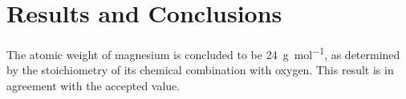 \documentclass[
	letterpaper, %
	10pt, %
]{class}
\begin{document}
\section{Results and Conclusions}

The atomic weight of magnesium is concluded to be \SI{24}{\gram\per\mol}, as determined by the stoichiometry of its chemical combination with oxygen. This result is in agreement with the accepted value.


\printbibliography %

\end{document}
